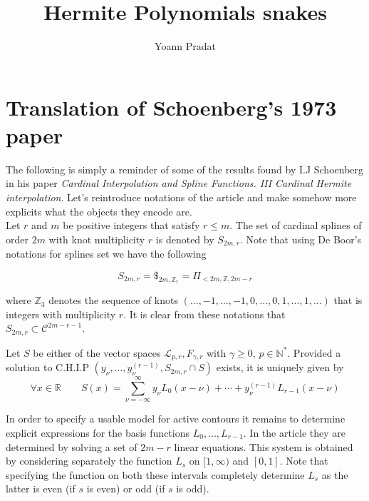 \documentclass[a4paper, 11pt]{article}
\begin{document}
\title{Hermite Polynomials snakes}
\author{Yoann Pradat}
\maketitle
\tableofcontents

\section{Translation of Schoenberg's 1973 paper}

The following is simply a reminder of some of the results found by I.J Schoenberg in his paper \emph{Cardinal 
Interpolation and Spline Functions. III Cardinal Hermite interpolation}. Let's reintroduce notations of the article and 
make somehow more explicits what the objects they encode are. \\

Let $r$ and $m$ be positive integers that satisfy $r \leq m$. The set of cardinal splines of order $2m$ with knot 
multiplicity $r$ is denoted by $S_{2m,r}$. Note that using De Boor's notations for splines set we have the following

\begin{equation}
  S_{2m,r} = \$_{2m, \mathbb{Z}_r} = \Pi_{< 2m, \mathbb{Z}, 2m-r}
\end{equation}

where $\mathbb{Z}_{3}$ denotes the sequence of knots $(\dots, -1,\dots,-1, 0, \dots, 0, 1, \dots, 1, \dots)$ that is 
integers with multiplicity $r$. It is clear from these notations that $S_{2m, r} \subset \mathcal{C}^{2m-r-1}$. 

\begin{thm}{1}
  Let $S$ be either of the vector spaces $\mathcal{L}_{p,r}, F_{\gamma,r}$ with $\gamma \geq 0$, $p \in \mathbb{N}^*$.  
  Provided a solution to C.H.I.P $\left( y_{\nu}, \dots,  y_{\nu}^{(r-1)}, S_{2m,r} \cap S \right)$ exists, it is 
  uniquely given by
  \begin{equation}
    \forall x \in \mathbb{R} \qquad S(x) = \sum_{\nu = - \infty}^{\infty} y_{\nu} L_0(x-\nu) + \cdots + y_{\nu}^{(r-1)} 
    L_{r-1}(x-\nu)
  \end{equation}
\end{thm}

In order to specify a usable model for active contours it remains to determine explicit expressions for the basis 
functions $L_0, \dots, L_{r-1}$. In the article they are determined by solving a set of $2m-r$ linear equations. This 
system is obtained by considering separately the function $L_s$ on $[1, \infty)$ and $[0,1]$. Note that specifying the 
function on both these intervals completely determine $L_s$ as the latter is even (if $s$ is even) or odd (if $s$ is 
odd). \\  
\end{document}
